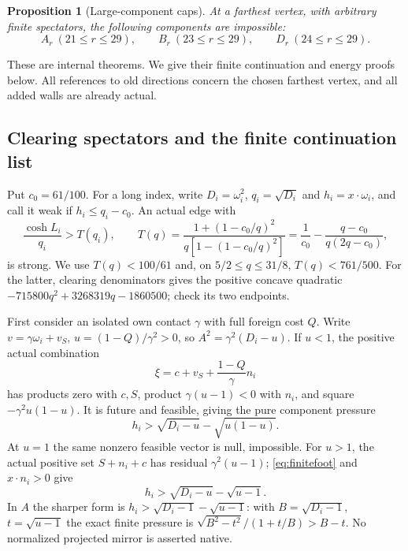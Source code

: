 \documentclass[11pt]{article}
\newtheorem{proposition}[theorem]{Proposition}
\theoremstyle{remark}
\begin{document}
\begin{proposition}[Large-component caps]\label{prop:caps}
At a farthest vertex, with arbitrary finite spectators, the following
components are impossible:
\[
 A_r\ (21\le r\le29),\qquad B_r\ (23\le r\le29),\qquad
 D_r\ (24\le r\le29).
\]
\end{proposition}

These are internal theorems. We give their finite continuation and
energy proofs below. All references to old directions concern the
chosen farthest vertex, and all added walls are already actual.

\subsection{Clearing spectators and the finite continuation list}
\label{sec:capinventory}

Put $c_0=61/100$. For a long index, write $D_i=\omega_i^2$,
$q_i=\sqrt{D_i}$ and $h_i=x\cdot\omega_i$, and call it weak if
$h_i\le q_i-c_0$. An actual edge with
\[
 \frac{\cosh L_i}{q_i}>T(q_i),\qquad
 T(q)=\frac{1+(1-c_0/q)^2}{q[1-(1-c_0/q)^2]}
      =\frac1{c_0}-\frac{q-c_0}{q(2q-c_0)},
\]
is strong. We use $T(q)<100/61$ and, on $5/2\le q\le31/8$,
$T(q)<761/500$. For the latter, clearing denominators gives the
positive concave quadratic
$-715800q^2+3268319q-1860500$; check its two endpoints.

First consider an isolated own contact $\gamma$ with full foreign
cost $Q$. Write $v=\gamma\omega_i+v_S$,
$u=(1-Q)/\gamma^2>0$, so $A^2=\gamma^2(D_i-u)$.
If $u<1$, the positive actual combination
\[
 \xi=c+v_S+\frac{1-Q}{\gamma}n_i
\]
has products zero with $c,S$, product $\gamma(u-1)<0$ with $n_i$,
and square $-\gamma^2u(1-u)$. It is future and feasible, giving
the pure component pressure
\begin{equation}\label{eq:clearforeign}
 h_i>\sqrt{D_i-u}-\sqrt{u(1-u)}.
\end{equation}
At $u=1$ the same nonzero feasible vector is null, impossible.
For $u>1$, the actual positive set $S+n_i+c$ has residual
$\gamma^2(u-1)$; \eqref{eq:finitefoot} and $x\cdot n_i>0$ give
\begin{equation}\label{eq:clearfinite}
 h_i>\sqrt{D_i-u}-\sqrt{u-1}.
\end{equation}
In $A$ the sharper form is $h_i>\sqrt{D_i-1}-\sqrt{u-1}$:
with $B=\sqrt{D_i-1}$, $t=\sqrt{u-1}$ the exact finite pressure
is $\sqrt{B^2-t^2}/(1+t/B)>B-t$.
No normalized projected mirror is asserted native.
\end{document}
